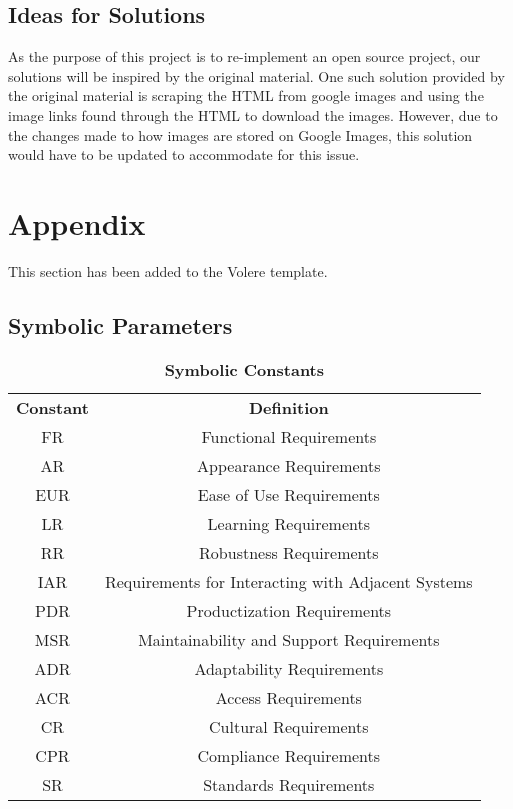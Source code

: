 \documentclass[12pt, titlepage]{article}
\begin{document}
\subsection{Ideas for Solutions}

As the purpose of this project is to re-implement an open source project, our solutions will be inspired by the original material. One such solution provided by the original material is scraping the HTML from google images and using the image links found through the HTML to download the images. However, due to the changes made to how images are stored on Google Images, this solution would have to be updated to accommodate for this issue.





\newpage

\section{Appendix}

This section has been added to the Volere template.

\subsection{Symbolic Parameters}

\begin{table}[ht]
\caption{\bf Symbolic Constants}
\centering
\begin{tabular}{ |c|c| } 
 \hline
 \textbf{Constant} & \textbf{Definition}\\ 
FR & Functional Requirements\\
AR & Appearance Requirements\\
EUR & Ease of Use Requirements\\
LR & Learning Requirements\\
RR & Robustness Requirements\\
IAR & Requirements for Interacting with Adjacent Systems\\
PDR & Productization Requirements\\
MSR & Maintainability and Support Requirements\\
ADR & Adaptability Requirements\\
ACR & Access Requirements\\
CR & Cultural Requirements\\
CPR & Compliance Requirements\\
SR & Standards Requirements\\
 \hline
\end{tabular}
\end{table}
\end{document}
